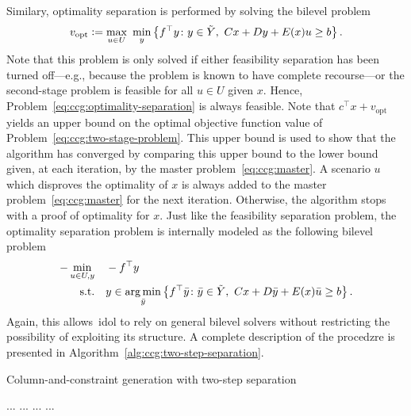 Similary, optimality separation is performed by solving the bilevel problem
\begin{equation}
    \label{eq:ccg:optimality-separation}
    v_\text{opt} \mathrel{{\mathop:}{=}}
    \max_{u\in U} \ \min_{y} \left\{ f^\top y \colon
        y\in\tilde{Y}, \ Cx + Dy + E(x)u \ge b
    \right\}.
\end{equation}
Note that this problem is only solved if either feasibility separation has
been turned off---e.g., because the problem is known to have complete
recourse---or the second-stage problem is feasible for all $u\in U$ given $x$.
Hence, Problem~\eqref{eq:ccg:optimality-separation} is always feasible. Note
that $c^\top x + v_\text{opt}$ yields an upper bound on the optimal objective
function value of Problem~\eqref{eq:ccg:two-stage-problem}. This upper bound
is used to show that the algorithm has converged by comparing this upper bound
to the lower bound given, at each iteration, by the master
problem~\eqref{eq:ccg:master}. A scenario $u$ which disproves the optimality
of $x$ is always added to the master problem~\eqref{eq:ccg:master} for the
next iteration. Otherwise, the algorithm stops with a proof of optimality for
$x$. Just like the feasibility separation problem, the optimality separation
problem is internally modeled as the following bilevel problem
%
\begin{subequations}
    \begin{align*}
        - \min_{u\in U,y} \quad & -f^\top y \\
        \text{s.t.} \quad & y \in \operatorname*{arg\,min}_{\bar{y}} \left\{ f^\top \bar{y} \colon
            \bar{y}\in\tilde{Y}, \ Cx + D\bar{y} + E(x)\bar{u} \ge b
        \right\}.
    \end{align*}
\end{subequations}
Again, this allows~\textsf{idol} to rely on general bilevel solvers without
restricting the possibility of exploiting its structure. A complete
description of the procedzre is presented in
Algorithm~\ref{alg:ccg:two-step-separation}.

\begin{algorithm}
    \caption{Column-and-constraint generation with two-step separation}
    \label{alg:ccg:two-step-separation}
    \begin{algorithmic}[1]
        \State ...
        \While {}
        \State ...
            \State ... 
        \EndIf
        \State ...
        \EndWhile
    \end{algorithmic}
\end{algorithm}

